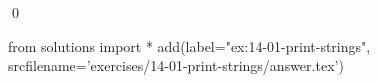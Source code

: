 
\begin{ex}
  \label{ex:14-01-print-strings}
  
  \qed
\end{ex}
\begin{python0}
from solutions import *
add(label="ex:14-01-print-strings",
    srcfilename='exercises/14-01-print-strings/answer.tex')
\end{python0}
